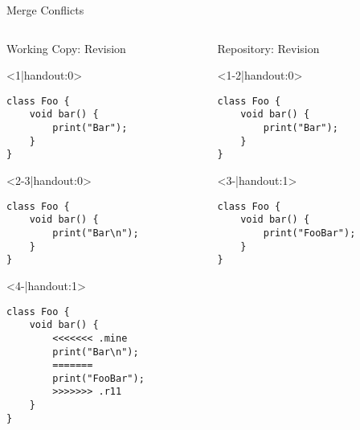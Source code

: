 \begin{frame}[fragile]{Merge Conflicts}	
	\begin{columns}[T, onlytextwidth]
		\begin{column}{0.6\linewidth}
			\begin{columns}[T]
				\begin{column}{0.5\linewidth}
					Working Copy: Revision \only<4>{\emph{11$^*$}}\\[2mm]
					
					\begin{onlyenv}<1|handout:0>
						\begin{lstlisting}[style=java,basicstyle=\fontfamily{pcr}\small\selectfont,numbers=none,escapechar=|]
class Foo {
	void bar() {
		print("Bar");
	}
}	
						\end{lstlisting}
					\end{onlyenv}
					\begin{onlyenv}
						\begin{lstlisting}[style=java,basicstyle=\fontfamily{pcr}\small\selectfont,numbers=none,escapechar=|]
class Foo {
	void bar() {
		print("Bar\n");
	}
}
						\end{lstlisting}
					\end{onlyenv}
					\begin{onlyenv}
						\begin{lstlisting}[style=java,basicstyle=\fontfamily{pcr}\small\selectfont,numbers=none,escapechar=|]
class Foo {
	void bar() {		
		<<<<<<< .mine
		print("Bar\n");
		=======
		print("FooBar");
		>>>>>>> .r11
	}
}	
						\end{lstlisting}
					\end{onlyenv}
				\end{column}
				\begin{column}{0.5\linewidth}					
					Repository: Revision \only<3->{\emph{11}}
					
					\begin{onlyenv}
						\begin{lstlisting}[style=java,basicstyle=\fontfamily{pcr}\small\selectfont,numbers=none,escapechar=|]
class Foo {
	void bar() {
		print("Bar");
	}
}
						\end{lstlisting}
					\end{onlyenv}
					\begin{onlyenv}
						\begin{lstlisting}[style=java,basicstyle=\fontfamily{pcr}\small\selectfont,numbers=none,escapechar=|]
class Foo {
	void bar() {
		print("FooBar");
	}
}
						\end{lstlisting}
					\end{onlyenv}
				\end{column}
			\end{columns}
			

\end{column}
\end{columns}
\end{frame}
